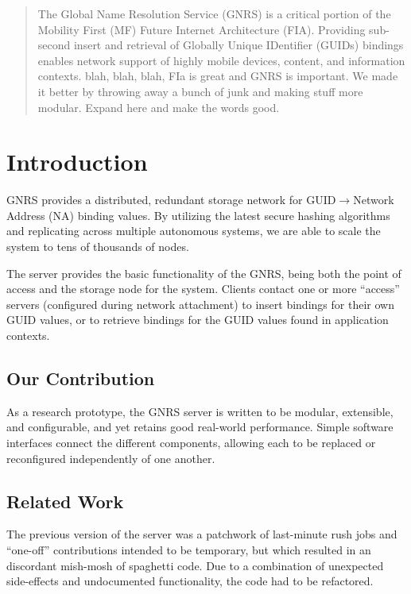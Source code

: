 \documentclass[conference, 11pt]{IEEEtran}
\begin{document}
\maketitle
\begin{abstract}
The Global Name Resolution Service (GNRS) is a critical portion of the
Mobility First (MF) Future Internet Architecture (FIA). Providing sub-second
insert and retrieval of Globally Unique IDentifier (GUIDs) bindings enables
network support of highly mobile devices, content, and information contexts.
blah, blah, blah, FIa is great and GNRS is important. We made it better by
throwing away a bunch of junk and making stuff more modular. Expand here and
make the words good.
\end{abstract}
\section{Introduction}
GNRS provides a distributed, redundant storage network for
GUID$\rightarrow$Network Address (NA) binding values.  By utilizing the latest
secure hashing algorithms and replicating across multiple autonomous systems,
we are able to scale the system to tens of thousands of nodes.  

The server provides the basic functionality of the GNRS, being both the point
of access and the storage node for the system.  Clients contact one or more
``access'' servers (configured during network attachment) to insert bindings
for their own GUID values, or to retrieve bindings for the GUID values found
in application contexts.
\subsection{Our Contribution}
As a research prototype, the GNRS server is written to be modular, extensible,
and configurable, and yet retains good real-world performance.  Simple
software interfaces connect the different components, allowing each to be
replaced or reconfigured independently of one another.
\subsection{Related Work}
The previous version of the server was a patchwork of last-minute rush jobs
and ``one-off'' contributions intended to be temporary, but which resulted in
an discordant mish-mosh of spaghetti code.  Due to a combination of unexpected
side-effects and undocumented functionality, the code had to be refactored.
\end{document}
